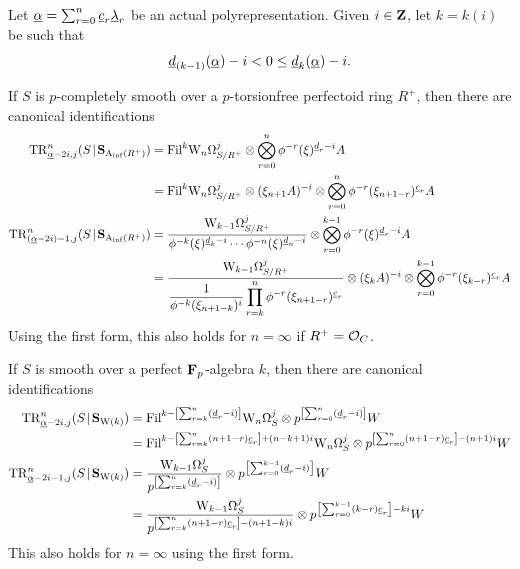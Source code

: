 \begin{corollary}
  Let $\m\alpha = \sum_{r=0}^n \m c_r \m\lambda_r$ be an actual polyrepresentation. Given $i\in\Z$, let $k=k(i)$ be such that
  \[ \m d_{(k-1)}(\m\alpha) - i < 0 \le \m d_k(\m\alpha) - i. \]

  If $S$ is $p$-completely smooth over a $p$-torsionfree perfectoid ring $R^+$, then there are canonical identifications
  \begin{align*}
    \TR^n_{\m\alpha-2i,j}(S\rel\SAinf{R^+})
      &= \Fil^k \dRW[n]^j_{S/R^+} \tnsr \bigotimes_{r=0}^n \phi^{-r}(\xi)^{\m d_r-i}A\\
      &= \Fil^k \dRW[n]^j_{S/R^+} \tnsr (\xi_{n+1} A)^{-i} \tnsr \bigotimes_{r=0}^n \phi^{-r}(\xi_{n+1-r})^{\m c_r} A\\
      \TR^n_{(\m\alpha-2i)-1,j}(S\rel\SAinf{R^+})
      &= \frac{\dRW[k-1]^j_{S/R^+}}{\phi^{-k}(\xi)^{\m d_k-i}\dotsm\phi^{-n}(\xi)^{\m d_n-i}}\tnsr\bigotimes_{r=0}^{k-1} \phi^{-r}(\xi)^{\m d_r-i}A\\
      &= \frac{\dRW[k-1]^j_{S/R^+}}{\ds\frac1{\phi^{-k}(\xi_{n+1-k})^i}\prod_{r=k}^n \phi^{-r}(\xi_{n+1-r})^{\m c_r}} \tnsr (\xi_k A)^{-i} \tnsr \bigotimes_{r=0}^{k-1} \phi^{-r}(\xi_{k-r})^{\m c_r} A
  \end{align*}
  Using the first form, this also holds for $n=\infty$ if $R^+=\O_C$.

  If $S$ is smooth over a perfect $\F_p$-algebra $k$, then there are canonical identifications
  \begin{align*}
    \TR^n_{\m\alpha-2i,j}(S\rel\SW k)
      &= \Fil^{k - \left[\sum_{r=k}^n (\m d_r - i) \right]} \dRW[n]^j_S\tnsr p^{\left[\sum_{r=0}^n (\m d_r - i) \right]}W\\
      &= \Fil^{k - \left[\sum_{r=k}^n (n+1-r)\m c_r\right] + (n-k+1)i} \dRW[n]^j_S\tnsr p^{\left[\sum_{r=0}^n (n+1-r)\m c_r\right] - (n+1)i}W\\
    \TR^n_{\m\alpha-2i-1,j}(S\rel\SW k)
      &= \frac{\dRW[k-1]^j_S}{p^{\left[\sum_{r=k}^n (\m d_r-i)\right]}}\tnsr p^{\left[\sum_{r=0}^{k-1} (\m d_r-i)\right]}W\\
      &= \frac{\dRW[k-1]^j_S}{p^{\left[\sum_{r=k}^n (n+1-r)\m c_r\right]-(n+1-k)i}}\tnsr p^{\left[\sum_{r=0}^{k-1}(k-r)\m c_r\right]-ki}W
  \end{align*}
  This also holds for $n=\infty$ using the first form.
\end{corollary}

